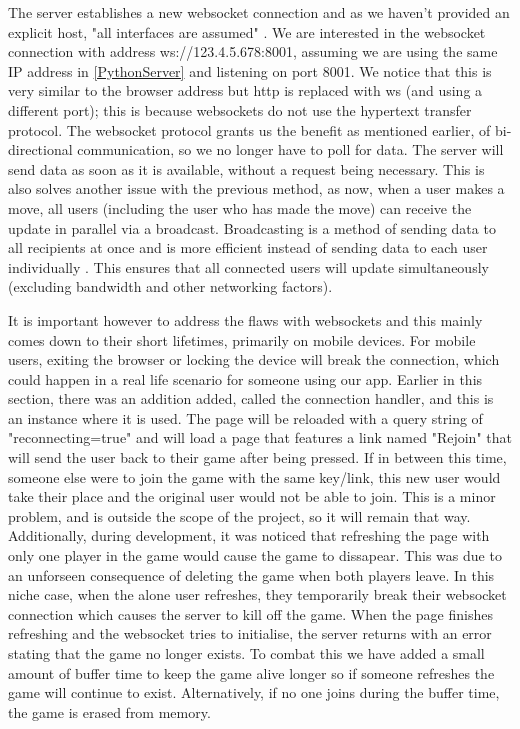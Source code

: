 The server establishes a new websocket connection and as we haven't provided an explicit host, "all interfaces are assumed" \cite{NoHost}. We are interested in the websocket connection with address ws://123.4.5.678:8001, assuming we are using the same IP address in \ref{PythonServer} and listening on port 8001. We notice that this is very similar to the browser address but http is replaced with ws (and using a different port); this is because websockets do not use the hypertext transfer protocol. The websocket protocol grants us the benefit as mentioned earlier, of bi-directional communication, so we no longer have to poll for data. The server will send data as soon as it is available, without a request being necessary. This is also solves another issue with the previous method, as now, when a user makes a move, all users (including the user who has made the move) can receive the update in parallel via a broadcast. Broadcasting is a method of sending data to all recipients at once and is more efficient instead of sending data to each user individually \cite{Broadcast}. This ensures that all connected users will update simultaneously (excluding bandwidth and other networking factors).

It is important however to address the flaws with websockets and this mainly comes down to their short lifetimes, primarily on mobile devices. For mobile users, exiting the browser or locking the device will break the connection, which could happen in a real life scenario for someone using our app. Earlier in this section, there was an addition added, called the connection handler, and this is an instance where it is used. The page will be reloaded with a query string of "reconnecting=true" and will load a page that features a link named "Rejoin" that will send the user back to their game after being pressed. If in between this time, someone else were to join the game with the same key/link, this new user would take their place and the original user would not be able to join. This is a minor problem, and is outside the scope of the project, so it will remain that way. Additionally, during development, it was noticed that refreshing the page with only one player in the game would cause the game to dissapear. This was due to an unforseen consequence of deleting the game when both players leave. In this niche case, when the alone user refreshes, they temporarily break their websocket connection which causes the server to kill off the game. When the page finishes refreshing and the websocket tries to initialise, the server returns with an error stating that the game no longer exists. To combat this we have added a small amount of buffer time to keep the game alive longer so if someone refreshes the game will continue to exist. Alternatively, if no one joins during the buffer time, the game is erased from memory.

